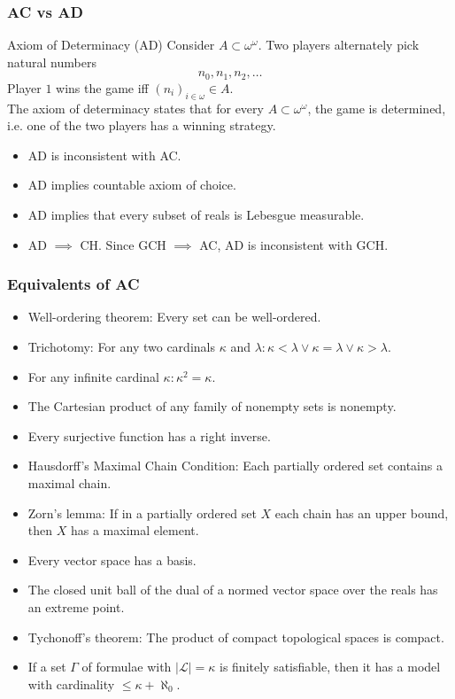 \documentclass[UTF8,11pt,colorlinks,compress,openany]{beamer}%
\begin{document}
\begin{frame}\frametitle{AC vs AD}
\setlength\abovedisplayskip{0pt}
\setlength\belowdisplayskip{0pt}
	\begin{block}{Axiom of Determinacy (AD)}
		Consider $A\subset\omega^\omega$. Two players alternately pick natural numbers
		\[n_0,n_1,n_2,\ldots\]
		Player $1$ wins the game iff $(n_i)_{i\in\omega}\in A$.\\
		The axiom of determinacy states that for every $A\subset\omega^\omega$, the game is determined, i.e. one of the two players has a winning strategy.
	\end{block}
	\vspace{7pt}
	\begin{itemize}
		\item AD is inconsistent with AC.
		\item AD implies countable axiom of choice.
		\item AD implies that every subset of reals is Lebesgue measurable.
		\item AD $\implies$ CH. Since GCH $\implies$ AC, AD is inconsistent with GCH.
	\end{itemize}
\end{frame}

\begin{frame}\frametitle{Equivalents of AC}
\begin{itemize}
				\item Well-ordering theorem: Every set can be well-ordered.
				\item Trichotomy: For any two cardinals $\kappa$ and $\lambda: \kappa<\lambda\vee\kappa=\lambda\vee \kappa>\lambda$.
				\item For any infinite cardinal $\kappa: \kappa^2=\kappa$.
				\item The Cartesian product of any family of nonempty sets is nonempty.
				\item Every surjective function has a right inverse.
				\item Hausdorff's Maximal Chain Condition: Each partially ordered set contains a maximal chain.
				\item Zorn's lemma: If in a partially ordered set $X$ each chain has an upper bound, then $X$ has a maximal element.
				\item Every vector space has a basis.
				\item The closed unit ball of the dual of a normed vector space over the reals has an extreme point.
				\item Tychonoff's theorem: The product of compact topological spaces is compact.
				\item If a set $\Gamma$ of formulae with $|\mathscr{L}|=\kappa$ is finitely satisfiable, then it has a model with cardinality $\leq \kappa+\aleph_0$.
\end{itemize}
\end{frame}
\end{document}
